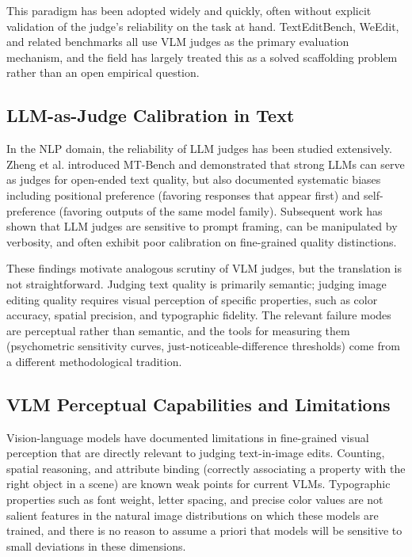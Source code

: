 This paradigm has been adopted widely and quickly, often without explicit validation of the judge's reliability on the task at hand. TextEditBench, WeEdit, and related benchmarks all use VLM judges as the primary evaluation mechanism, and the field has largely treated this as a solved scaffolding problem rather than an open empirical question.

\subsection{LLM-as-Judge Calibration in Text}

In the NLP domain, the reliability of LLM judges has been studied extensively. %
Zheng et al. introduced MT-Bench and demonstrated that strong LLMs can serve as judges for open-ended text quality, but also documented systematic biases including positional preference (favoring responses that appear first) and self-preference (favoring outputs of the same model family). %
Subsequent work has shown that LLM judges are sensitive to prompt framing, can be manipulated by verbosity, and often exhibit poor calibration on fine-grained quality distinctions. %

These findings motivate analogous scrutiny of VLM judges, but the translation is not straightforward. Judging text quality is primarily semantic; judging image editing quality requires visual perception of specific properties, such as color accuracy, spatial precision, and typographic fidelity. The relevant failure modes are perceptual rather than semantic, and the tools for measuring them (psychometric sensitivity curves, just-noticeable-difference thresholds) come from a different methodological tradition.

\subsection{VLM Perceptual Capabilities and Limitations}

Vision-language models have documented limitations in fine-grained visual perception that are directly relevant to judging text-in-image edits. Counting, spatial reasoning, and attribute binding (correctly associating a property with the right object in a scene) are known weak points for current VLMs. %
Typographic properties such as font weight, letter spacing, and precise color values are not salient features in the natural image distributions on which these models are trained, and there is no reason to assume a priori that models will be sensitive to small deviations in these dimensions.

